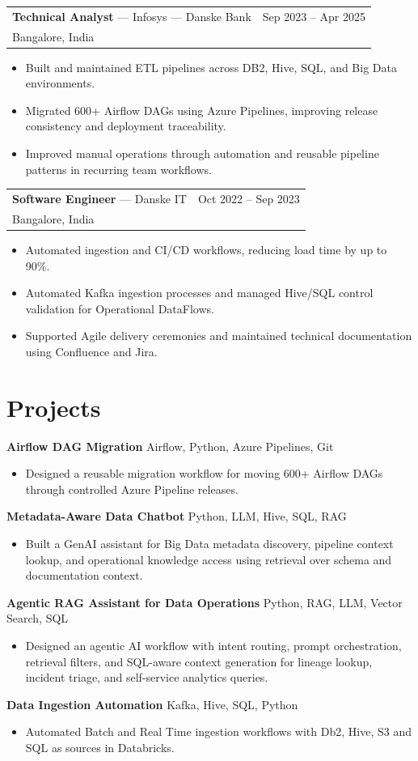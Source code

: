 \documentclass[10pt,letterpaper]{article}
\newcommand{\role}[4]{
  \begin{tabularx}{\textwidth}{X r}
    \textbf{#1} --- #2 & \textcolor{muted}{#3} \\
    \textcolor{muted}{#4} & \\
  \end{tabularx}
  \vspace{-0.85em}
}
\newcommand{\project}[3]{
  \textbf{#1} \hfill \textcolor{muted}{#2}
  \begin{itemize}
    #3
  \end{itemize}
}
\begin{document}
\role{Technical Analyst}{Infosys --- Danske Bank}{Sep 2023 -- Apr 2025}{Bangalore, India}
\begin{itemize}
  \item Built and maintained ETL pipelines across DB2, Hive, SQL, and Big Data environments.
  \item Migrated 600+ Airflow DAGs using Azure Pipelines, improving release consistency and deployment traceability.
  \item Improved manual operations through automation and reusable pipeline patterns in recurring team workflows.
\end{itemize}

\role{Software Engineer}{Danske IT}{Oct 2022 -- Sep 2023}{Bangalore, India}
\begin{itemize}
  \item Automated ingestion and CI/CD workflows, reducing load time by up to 90\%.
  \item Automated Kafka ingestion processes and managed Hive/SQL control validation for Operational DataFlows.
  \item Supported Agile delivery ceremonies and maintained technical documentation using Confluence and Jira.
\end{itemize}

\section*{Projects}
\project{Airflow DAG Migration}{Airflow, Python, Azure Pipelines, Git}{
  \item Designed a reusable migration workflow for moving 600+ Airflow DAGs through controlled Azure Pipeline releases.
}

\project{Metadata-Aware Data Chatbot}{Python, LLM, Hive, SQL, RAG}{
  \item Built a GenAI assistant for Big Data metadata discovery, pipeline context lookup, and operational knowledge access using retrieval over schema and documentation context.
}

\project{Agentic RAG Assistant for Data Operations}{Python, RAG, LLM, Vector Search, SQL}{
  \item Designed an agentic AI workflow with intent routing, prompt orchestration, retrieval filters, and SQL-aware context generation for lineage lookup, incident triage, and self-service analytics queries.
}

\project{Data Ingestion Automation}{Kafka, Hive, SQL, Python}{
  \item Automated Batch and Real Time ingestion workflows with Db2, Hive, S3 and SQL as sources in Databricks. 
}
\end{document}
